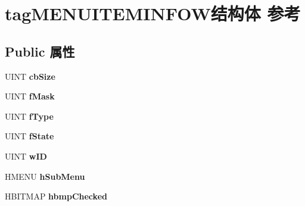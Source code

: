 \hypertarget{structtag_m_e_n_u_i_t_e_m_i_n_f_o_w}{}\section{tag\+M\+E\+N\+U\+I\+T\+E\+M\+I\+N\+F\+O\+W结构体 参考}
\label{structtag_m_e_n_u_i_t_e_m_i_n_f_o_w}
\subsection*{Public 属性}
\begin{DoxyCompactItemize}
\item 
\mbox{\label{structtag_m_e_n_u_i_t_e_m_i_n_f_o_w_a62f73737aad75d17785ba066bff8f09c}} 
U\+I\+NT {\bfseries cb\+Size}
\item 
\mbox{\label{structtag_m_e_n_u_i_t_e_m_i_n_f_o_w_a25311573f1b6a59136c3706a198bc561}} 
U\+I\+NT {\bfseries f\+Mask}
\item 
\mbox{\label{structtag_m_e_n_u_i_t_e_m_i_n_f_o_w_a9e1a680fdda9335e34c27baf0c50bc51}} 
U\+I\+NT {\bfseries f\+Type}
\item 
\mbox{\label{structtag_m_e_n_u_i_t_e_m_i_n_f_o_w_af5f77ad7ecf1f4a61a4b7f579f0d47e9}} 
U\+I\+NT {\bfseries f\+State}
\item 
\mbox{\label{structtag_m_e_n_u_i_t_e_m_i_n_f_o_w_aeb0b5e7b92ca0affd41b340c7ec8cdec}} 
U\+I\+NT {\bfseries w\+ID}
\item 
\mbox{\label{structtag_m_e_n_u_i_t_e_m_i_n_f_o_w_a13d2b20777e7ca08c7142268260a5c7f}} 
H\+M\+E\+NU {\bfseries h\+Sub\+Menu}
\item 
\mbox{\label{structtag_m_e_n_u_i_t_e_m_i_n_f_o_w_ac9cd8a7380384fd34366e4dbf67418b9}} 
H\+B\+I\+T\+M\+AP {\bfseries hbmp\+Checked}
\item 
\mbox{\label{structtag_m_e_n_u_i_t_e_m_i_n_f_o_w_af498c0a1cbad727a75984e3af1c57215}} 

\end{DoxyCompactItemize}
